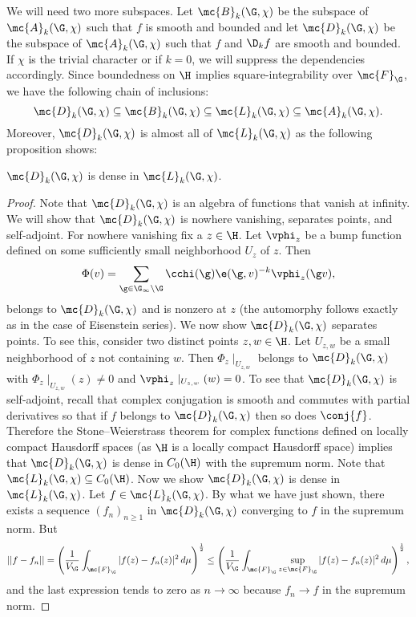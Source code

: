     We will need two more subspaces. Let $\mc{B}_{k}(\G,\chi)$ be the subspace of $\mc{A}_{k}(\G,\chi)$ such that $f$ is smooth and bounded and let $\mc{D}_{k}(\G,\chi)$ be the subspace of $\mc{A}_{k}(\G,\chi)$ such that $f$ and $\D_{k}f$ are smooth and bounded. If $\chi$ is the trivial character or if $k = 0$, we will suppress the dependencies accordingly. Since boundedness on $\H$ implies square-integrability over $\mc{F}_{\G}$, we have the following chain of inclusions:
    \[
      \mc{D}_{k}(\G,\chi) \subseteq \mc{B}_{k}(\G,\chi) \subseteq \mc{L}_{k}(\G,\chi) \subseteq \mc{A}_{k}(\G,\chi).
    \]
    Moreover, $\mc{D}_{k}(\G,\chi)$ is almost all of $\mc{L}_{k}(\G,\chi)$ as the following proposition shows:

    \begin{proposition}\label{prop:dense_subspace_of_square-integrable_modular_functions}
      $\mc{D}_{k}(\G,\chi)$ is dense in $\mc{L}_{k}(\G,\chi)$.
    \end{proposition}
    \begin{proof}
      Note that $\mc{D}_{k}(\G,\chi)$ is an algebra of functions that vanish at infinity. We will show that $\mc{D}_{k}(\G,\chi)$ is nowhere vanishing, separates points, and self-adjoint. For nowhere vanishing fix a $z \in \H$. Let $\vphi_{z}$ be a bump function defined on some sufficiently small neighborhood $U_{z}$ of $z$. Then
      \[
        \Phi(v) = \sum_{\g \in \G_{\infty}\backslash\G}\cchi(\g)\e(\g,v)^{-k}\vphi_{z}(\g v),
      \]
      belongs to $\mc{D}_{k}(\G,\chi)$ and is nonzero at $z$ (the automorphy follows exactly as in the case of Eisenstein series). We now show $\mc{D}_{k}(\G,\chi)$ separates points. To see this, consider two distinct points $z,w \in \H$. Let $U_{z,w}$ be a small neighborhood of $z$ not containing $w$. Then $\Phi_{z}\mid_{U_{z,w}}$ belongs to $\mc{D}_{k}(\G,\chi)$ with $\Phi_{z}\mid_{U_{z,w}}(z) \neq 0$ and $\vphi_{z}\mid_{U_{z,w}}(w) = 0$. To see that $\mc{D}_{k}(\G,\chi)$ is self-adjoint, recall that complex conjugation is smooth and commutes with partial derivatives so that if $f$ belongs to $\mc{D}_{k}(\G,\chi)$ then so does $\conj{f}$. Therefore the Stone–Weierstrass theorem for complex functions defined on locally compact Hausdorff spaces (as $\H$ is a locally compact Hausdorff space) implies that $\mc{D}_{k}(\G,\chi)$ is dense in $C_{0}(\H)$ with the supremum norm. Note that $\mc{L}_{k}(\G,\chi) \subseteq C_{0}(\H)$. Now we show $\mc{D}_{k}(\G,\chi)$ is dense in $\mc{L}_{k}(\G,\chi)$. Let $f \in \mc{L}_{k}(\G,\chi)$. By what we have just shown, there exists a sequence $(f_{n})_{n \ge 1}$ in $\mc{D}_{k}(\G,\chi)$ converging to $f$ in the supremum norm. But 
      \[
        ||f-f_{n}|| = \left(\frac{1}{V_{\G}}\int_{\mc{F}_{\G}}|f(z)-f_{n}(z)|^{2}\,d\mu\right)^{\frac{1}{2}} \le \left(\frac{1}{V_{\G}}\int_{\mc{F}_{\G}}\sup_{z \in \mc{F}_{\G}}|f(z)-f_{n}(z)|^{2}\,d\mu\right)^{\frac{1}{2}},
      \]
      and the last expression tends to zero as $n \to \infty$ because $f_{n} \to f$ in the supremum norm.
    \end{proof}


